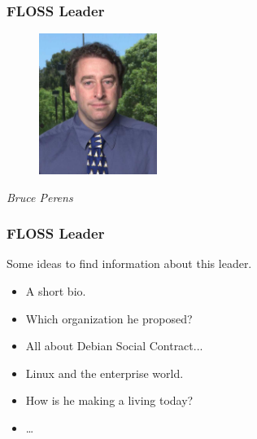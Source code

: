 \documentclass{beamer}
\begin{document}
\begin{frame}
\frametitle{FLOSS Leader}

\begin{figure}[h]
\begin{center}
  \includegraphics[height=1.80in]{figs/bruceperens.jpg}
\end{center}
\end{figure}

\pause

\begin{center}
{\it Bruce Perens}
\end{center}

\end{frame}

\begin{frame}
\frametitle{FLOSS Leader}

Some ideas to find information about this leader.
\pause
\begin{itemize}
\item A short bio.
\item Which organization he proposed?
\item All about Debian Social Contract...
\item Linux and the enterprise world.
\item How is he making a living today?
\item \ldots
\end{itemize}

\end{frame}
\end{document}
